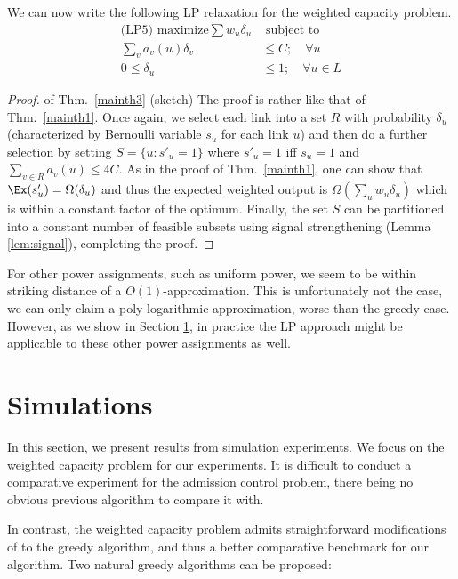 \documentclass[11pt]{amsart}
\begin{document}
We can now write the following LP relaxation for the weighted capacity problem.
\begin{align}
 \text{(LP5) maximize} \sum w_u \delta_u &  \text{ subject to} \nonumber\\
  \sum_{v} a_v(u) \delta_v & \leq C; \quad \forall u \label{inaffectancebound1}\\
  0 \leq \delta_u & \leq 1; \quad \forall u \in L \nonumber
\end{align}



\begin{proof}{of Thm.~\ref{mainth3} (sketch)}
The proof is rather like that of Thm.~\ref{mainth1}. Once again, we select each link into a set $R$ with probability $\delta_u$ (characterized by Bernoulli variable $s_u$ for each link $u$) and then do a further selection by setting $S = \{u : s'_u = 1\}$ where $s'_u = 1$ iff $s_u = 1$ and $\sum_{v \in R} a_v(u) \leq 4 C$. As in the proof of Thm.~\ref{mainth1}, one can show that $\Ex(s'_u) = \Omega(\delta_u)$ and thus the expected weighted output is $\Omega(\sum_{u} w_u \delta_u)$ which is within a constant factor of the optimum. Finally, the set $S$ can be partitioned into a constant number of
feasible subsets using signal strengthening (Lemma \ref{lem:signal}), completing the proof.
\end{proof}

For other power assignments, such as uniform power, we seem to be within striking distance of a $O(1)$-approximation.
This is unfortunately not the case, we can only claim a poly-logarithmic approximation, worse than the greedy case. However, as
we show in Section \ref{sec:simul}, in practice the LP approach might be applicable to these other power assignments as well.



\section{Simulations}
\label{sec:simul}
In this section, we present results from simulation experiments. We focus on the weighted capacity problem for our experiments. It is difficult to conduct a comparative experiment for the admission control problem, there being no obvious previous algorithm to compare it with.

In contrast, the weighted capacity problem admits straightforward modifications of to the greedy algorithm, and thus a better comparative benchmark for our algorithm. Two natural greedy algorithms can be proposed:
\end{document}
